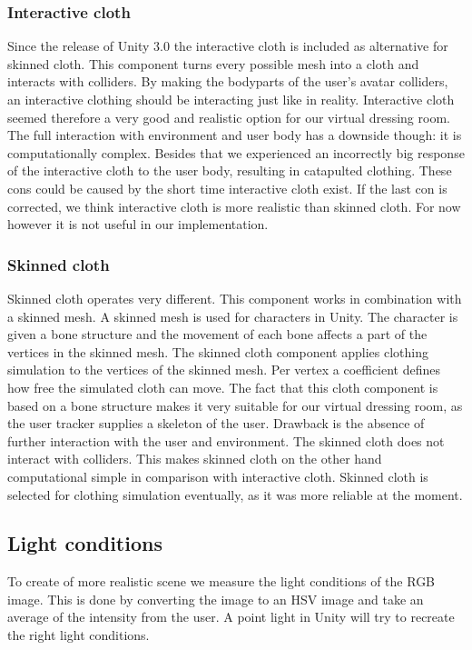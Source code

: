 \documentclass[twocolumn,a4paper]{article}
\begin{document}
\subsubsection{Interactive cloth}
\label{sec:interactive_cloth}	
Since the release of Unity 3.0 the interactive cloth is included as alternative for skinned cloth. This component turns every possible mesh into a cloth and interacts with colliders. By making the bodyparts of the user's avatar colliders, an interactive clothing should be interacting just like in reality. Interactive cloth seemed therefore a very good and realistic option for our virtual dressing room. The full interaction with environment and user body has a downside though: it is computationally complex. Besides that we experienced an incorrectly big response of the interactive cloth to the user body, resulting in catapulted clothing. These cons could be caused by the short time interactive cloth exist. If the last con is corrected, we think interactive cloth is more realistic than skinned cloth. For now however it is not useful in our implementation.
	 	
\subsubsection{Skinned cloth}
\label{sec:skinned_cloth}	 	
Skinned cloth operates very different. This component works in combination with a skinned mesh. A skinned mesh is used for characters in Unity. The character is given a bone structure and the movement of each bone affects a part of the vertices in the skinned mesh. The skinned cloth component applies clothing simulation to the vertices of the skinned mesh. Per vertex a coefficient defines how free the simulated cloth can move. The fact that this cloth component is based on a bone structure makes it very suitable for our virtual dressing room, as the user tracker supplies a skeleton of the user. Drawback is the absence of further interaction with the user and environment. The skinned cloth does not interact with colliders. This makes skinned cloth on the other hand computational simple in comparison with interactive cloth. Skinned cloth is selected for clothing simulation eventually, as it was more reliable at the moment.

\subsection{Light conditions}
\label{sec:light_conditions}
To create of more realistic scene we measure the light conditions of the RGB image. This is done by converting the image to an HSV image and take an average of the intensity from the user.
A point light in Unity will try to recreate the right light conditions.
\end{document}

